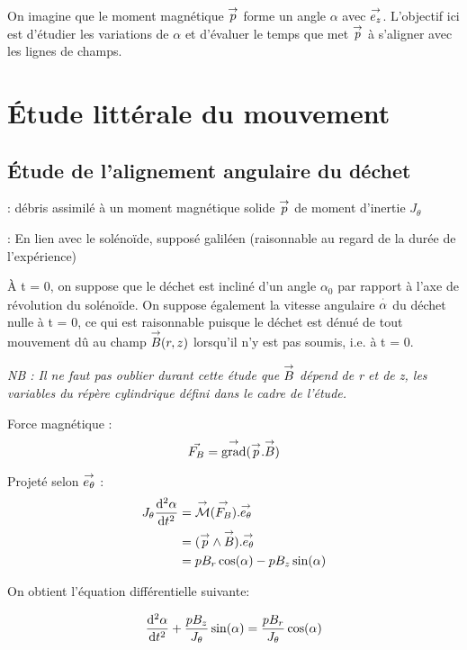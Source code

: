 \documentclass{report}
\begin{document}
On imagine que le moment magnétique $\overset{\to}{p}$ forme un angle $\alpha$ avec $\overset{\to}{e_z}$. L'objectif ici est d'étudier les variations de $\alpha$ et d'évaluer le temps que met $\overset{\to}{p}$ à s'aligner avec les lignes de champs.
\newpage
\section{Étude littérale du mouvement}
\subsection{Étude de l'alignement angulaire du déchet}

: {débris assimilé à un moment magnétique solide $\overset{\to}{p}$ de moment d'inertie $J_\theta$}

: En lien avec le solénoïde, supposé galiléen (raisonnable au regard de la durée de l'expérience)


À t = 0, on suppose que le déchet est incliné d'un angle $\alpha_0$ par rapport à l'axe de révolution du solénoïde. On suppose également la vitesse angulaire $\overset{\cdot}{\alpha}$ du déchet nulle à t = 0, ce qui est raisonnable puisque le déchet est dénué de tout mouvement dû au champ $\overset{\to}{B}(r,z)$ lorsqu'il n'y est pas soumis, i.e. à t = 0.


\emph{NB : Il ne faut pas oublier durant cette étude que $\overset{\to}{B}$ dépend de r et de z, les variables du répère cylindrique défini dans le cadre de l'étude.}

Force magnétique :
$$\vec{F_B} = \overset{\to}{\text{grad}}(\overset{\to}{p}.\overset{\to}{B})$$


Projeté selon $\overset{\to}{e_\theta}$ :
\begin{align*}
J_\theta \frac{\mathrm{d^2}\alpha}{\mathrm{d}t^2} &= \overset{\to}{\mathcal{M}}(\overset{\to}{F_B}) . \overset{\to}{e_\theta} \\
&= (\overset{\to}{p} \wedge \overset{\to}{B}).\overset{\to}{e_\theta}\\
&= pB_r \cos(\alpha) - pB_z\sin(\alpha)
\end{align*}

On obtient l'équation différentielle suivante:
\begin{prettybox}[blue]
$$\frac{\mathrm{d^2}\alpha}{\mathrm{d}t^2} + \frac{pB_z}{J_\theta}\sin(\alpha) = \frac{pB_r}{J_\theta} \cos(\alpha)$$
\end{prettybox}
\end{document}
